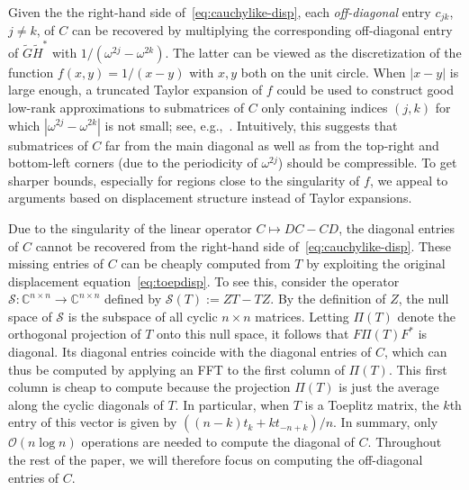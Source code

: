 \documentclass[final,reqno,onefignum,onetabnum]{siamart190516}
\begin{document}
Given the the right-hand side of~\eqref{eq:cauchylike-disp}, each \emph{off-diagonal} entry $c_{jk}$, $j\not = k$, of $C$ can be recovered by multiplying the corresponding off-diagonal entry of $\widetilde{G}\widetilde{H}^*$ with
$1/(\omega^{2j} - \omega^{2k})$. The latter can be viewed as the discretization of the function $f(x,y) = 1/(x-y)$ with $x,y$ both on the unit circle. When $|x-y|$ is large enough, a truncated Taylor expansion of $f$ could be used to construct good low-rank approximations to
submatrices of $C$ only containing indices $(j,k)$ for which $|\omega^{2j} - \omega^{2k}|$ is not small; see, e.g.,~\cite{Boerm2010}.
Intuitively, this suggests that submatrices of $C$ far from the main diagonal as well as from the top-right and bottom-left corners (due to the periodicity of $\omega^{2j}$) should be compressible.  To get sharper bounds, especially for regions close to the singularity of $f$, we appeal to arguments based on displacement structure instead of Taylor expansions. 

Due to the singularity of the linear operator $C \mapsto DC - CD$, the diagonal entries of $C$ cannot be recovered from the right-hand side of~\eqref{eq:cauchylike-disp}. These missing entries of $C$ can be cheaply computed from $T$ by exploiting the original displacement equation~\eqref{eq:toepdisp}. To see this, consider the operator $\mathcal{S}:  \mathbb{C}^{n \times n} \to \mathbb{C}^{n \times n}$ defined by $\mathcal{S}(T) := ZT-TZ$. By the definition of $Z$, the null space of $\mathcal{S}$ is the subspace of all cyclic $n \times n$ matrices. Letting 
$\Pi(T)$ denote the orthogonal projection of $T$ onto this null space, it follows that $F \Pi(T) F^*$ is diagonal. Its diagonal entries coincide with the diagonal entries of $C$, which can thus be computed by
applying an FFT to the first column of $\Pi(T)$. This first column is cheap to compute because the projection
$\Pi(T)$ is just the average along the cyclic diagonals of $T$. In particular, when $T$ is a Toeplitz matrix,
the $k$th entry of this vector is given by 
$ \left( (n-k)t_{k}  + k t_{-n+k}  \right)/n.$
In summary, only $\mathcal{O}(n \log n)$ operations are needed to compute the diagonal of $C$. Throughout the rest of the paper, we will therefore focus on computing the off-diagonal entries of $C$.
\end{document}
